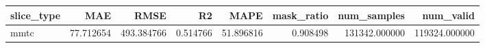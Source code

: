 \begin{tabular}{lrrrrrrr}
\toprule
slice_type & MAE & RMSE & R2 & MAPE & mask_ratio & num_samples & num_valid \\
\midrule
mmtc & 77.712654 & 493.384766 & 0.514766 & 51.896816 & 0.908498 & 131342.000000 & 119324.000000 \\
\bottomrule
\end{tabular}

